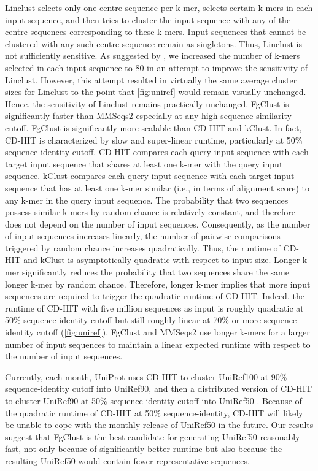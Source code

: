 \documentclass[11pt,letterpaper]{article}
\begin{document}
Linclust 
	selects only one centre sequence per k-mer, 
	selects certain k-mers in each input sequence, 
	and then tries to cluster the input sequence with any of the centre sequences corresponding to these k-mers.
Input sequences that cannot be clustered with any such centre sequence remain as singletons.
Thus, Linclust is not sufficiently sensitive.
As suggested by \citet{steinegger2017linclust},
we increased the number of k-mers selected in each input sequence to 80 in an attempt to improve the sensitivity of Linclust.
However, this attempt resulted in virtually the same average cluster sizes for Linclust to the point that \cref{fig:uniref} would remain visually unchanged. Hence, the sensitivity of Linclust remains practically unchanged.
FgClust is significantly faster than MMSeqs2 especially at any high sequence similarity cutoff.
FgClust is significantly more scalable than CD-HIT and kClust. 
In fact, CD-HIT is characterized by slow and super-linear runtime, particularly at 50\% sequence-identity cutoff.
CD-HIT compares each query input sequence with each target input sequence that shares at least one k-mer with the query input sequence.
kClust compares each query input sequence with each target input sequence that has at least one k-mer similar (i.e., in terms of alignment score) to any k-mer in the query input sequence.
The probability that two sequences possess similar k-mers by random chance is relatively constant, and therefore does not depend on the number of input sequences.
Consequently, as the number of input sequences increases linearly, the number of pairwise comparisons triggered by random chance increases quadratically.
Thus, the runtime of CD-HIT and kClust is asymptotically quadratic with respect to input size.
Longer k-mer significantly reduces the probability that two sequences share the same longer k-mer by random chance.
Therefore, longer k-mer implies that more input sequences are required to trigger the quadratic runtime of CD-HIT.
Indeed, the runtime of CD-HIT with five million sequences as input is roughly quadratic at 50\% sequence-identity cutoff but still roughly linear at 70\% or more sequence-identity cutoff (\cref{fig:uniref}).
FgClust and MMSeqs2 use longer k-mers for a larger number of input sequences to maintain a linear expected runtime with respect to the number of input sequences.

Currently, each month, UniProt uses CD-HIT to cluster UniRef100 at 90\% sequence-identity cutoff into UniRef90, and then a distributed version of CD-HIT to cluster UniRef90 at 50\% sequence-identity cutoff into UniRef50 \citep{suzek2014uniref}.
Because of the quadratic runtime of CD-HIT at 50\% sequence-identity, CD-HIT will likely be unable to cope with the monthly release of UniRef50 in the future.
Our results suggest that FgClust is the best candidate for generating UniRef50 reasonably fast, not only because of significantly better runtime but also because the resulting UniRef50 would contain fewer representative sequences.
\end{document}
